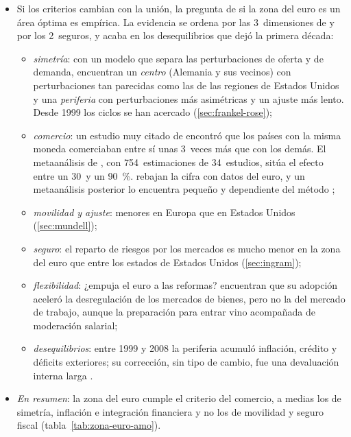 \documentclass[11pt]{article}
\begin{document}
\begin{itemize}
\item Si los criterios cambian con la unión, la pregunta de si la zona del euro es un área óptima es empírica. La evidencia se ordena por las 3~dimensiones de  y por los 2~seguros, y acaba en los desequilibrios que dejó la primera década:
  \begin{itemize}
  \item \emph{simetría}: con un modelo que separa las perturbaciones de oferta y de demanda, \textcite{BayoumiEichengreen1993Shocking} encuentran un \emph{centro} (Alemania y sus vecinos) con perturbaciones tan parecidas como las de las regiones de Estados Unidos y una \emph{periferia} con perturbaciones más asimétricas y un ajuste más lento. Desde 1999 los ciclos se han acercado (\ref{sec:frankel-rose});
  \item \emph{comercio}: un estudio muy citado de \textcite{Rose2000One} encontró que los países con la misma moneda comerciaban entre sí unas 3~veces más que con los demás. El metaanálisis de \textcite{RoseStanley2005Meta}, con 754~estimaciones de 34~estudios, sitúa el efecto entre un 30~y un 90~\%. \textcite{GlickRose2016Currency} rebajan la cifra con datos del euro, y un metaanálisis posterior lo encuentra pequeño y dependiente del método\nocite{Polak2019Euro} ;
  \item \emph{movilidad y ajuste}: menores en Europa que en Estados Unidos (\ref{sec:mundell});
  \item \emph{seguro}: el reparto de riesgos por los mercados es mucho menor en la zona del euro que entre los estados de Estados Unidos (\ref{sec:ingram});
  \item \emph{flexibilidad}: ¿empuja el euro a las reformas? \textcite{AlesinaArdagnaGalasso2011Euro} encuentran que su adopción aceleró la desregulación de los mercados de bienes, pero no la del mercado de trabajo, aunque la preparación para entrar vino acompañada de moderación salarial;
  \item \emph{desequilibrios}: entre 1999 y 2008 la periferia acumuló inflación, crédito y déficits exteriores; su corrección, sin tipo de cambio, fue una devaluación interna larga .
  \end{itemize}
\item \emph{En resumen}: la zona del euro cumple el criterio del comercio, a medias los de simetría, inflación e integración financiera y no los de movilidad y seguro fiscal (tabla~\ref{tab:zona-euro-amo}).
\end{itemize}
\end{document}
